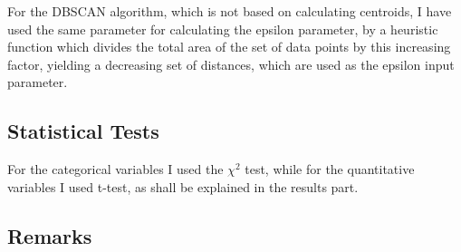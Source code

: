 \documentclass{article}
\begin{document}
For the DBSCAN algorithm, which is not based on calculating centroids, I have used the same parameter for calculating the epsilon parameter, by a heuristic function which divides the total area of the set of data points by this increasing factor, yielding a decreasing set of distances, which are used as the epsilon input parameter.

\subsection{Statistical Tests}
For the categorical variables I used the $\chi^2$ test, while for the quantitative variables I used t-test, as shall be explained in the results part. 
\subsection{Remarks}
\end{document}

